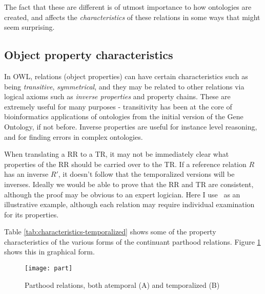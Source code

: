 \documentclass{bioinfo}
\def\partOf{\pr{part\_of}}
\begin{document}
The fact that these are different is of utmost importance to how
ontologies are created, and affects the \emph{characteristics} of
these relations in some ways that might seem surprising.

\subsection{Object property characteristics}

In OWL, relations (object properties) can have certain characteristics
such as being \emph{transitive}, \emph{symmetrical}, and they may be
related to other relations via logical axioms such as \emph{inverse
  properties} and property chains. These are extremely useful for many
purposes - transitivity has been at the core of bioinformatics
applications of ontologies from the initial version of the Gene
Ontology\cite{Ashburner2000}, if not before. Inverse properties are
useful for instance level reasoning, and for finding errors in complex
ontologies.

When translating a RR to a TR, it may not be immediately clear what
properties of the RR should be carried over to the TR. If a reference
relation $R$ has an inverse $R'$, it doesn't follow that the
temporalized versions will be inverses. Ideally we would be able to
prove that the RR and TR are consistent, although the proof may be
obvious to an expert logician. Here I use \partOf\ as an illustrative
example, although each relation may require individual examination for
its properties.

Table \ref{tab:characteristics-temporalized} shows some of the
property characteristics of the various forms of the continuant
parthood relations. Figure \ref{fig:part} shows this in graphical
form.

\begin{figure}
\center
\texttt{[image: part]}
\caption{Parthood relations, both atemporal (A) and temporalized (B)}
\label{fig:part}
\end{figure}
\end{document}
